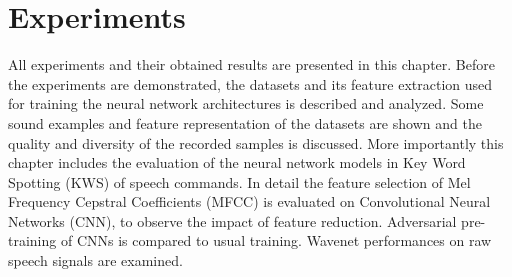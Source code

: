 
\chapter{Experiments}\label{sec:exp}
All experiments and their obtained results are presented in this chapter.
Before the experiments are demonstrated, the datasets and its feature extraction used for training the neural network architectures is described and analyzed.
Some sound examples and feature representation of the datasets are shown and the quality and diversity of the recorded samples is discussed.
More importantly this chapter includes the evaluation of the neural network models in Key Word Spotting (KWS) of speech commands.
In detail the feature selection of Mel Frequency Cepstral Coefficients (MFCC) is evaluated on Convolutional Neural Networks (CNN), to observe the impact of feature reduction.
Adversarial pre-training of CNNs is compared to usual training.
Wavenet performances on raw speech signals are examined.











